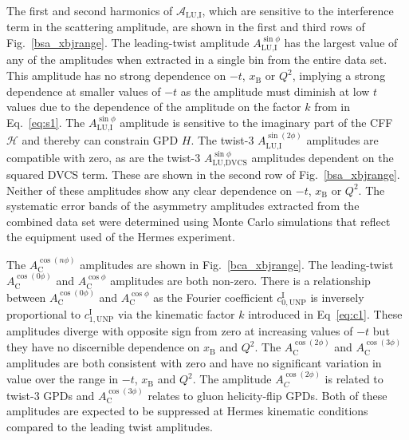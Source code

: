 The first and second harmonics of $\mathcal{A}_{\textrm{LU,I}}$, which are
sensitive to the interference term in the scattering amplitude, are shown in the first and third rows of Fig.~\ref{bsa_xbjrange}. The leading-twist amplitude $A_{\textrm{LU,I}}^{\sin\phi}$ has the largest value of any of the amplitudes when extracted in a single bin from the entire data set. This amplitude has no strong dependence on $-t$, $x_{\textrm{B}}$ or $Q^{2}$, implying a strong dependence at smaller values of $-t$ as the amplitude must diminish at low $t$ values due to the dependence of the amplitude on the factor $k$ from in Eq.~\ref{eq:s1}. The $A_{\textrm{LU,I}}^{\sin\phi}$ amplitude is sensitive to the imaginary part of the CFF $\mathcal{H}$ and thereby can constrain GPD $\textit{H}$. The twist-3 $A_{\textrm{LU,I}}^{\sin(2\phi)}$ amplitudes are compatible with zero, as are the twist-3 $A_{\textrm{LU,DVCS}}^{\sin\phi}$ amplitudes dependent on the squared DVCS term. These are shown in the second row of Fig.~\ref{bsa_xbjrange}. Neither of these amplitudes show any clear dependence on $-t$, $x_{\textrm{B}}$ or $Q^{2}$. The systematic error bands of the asymmetry amplitudes extracted from the combined data set were determined using Monte Carlo simulations that reflect the equipment used  of the H{\sc ermes} experiment. 

The $A_{\textrm{C}}^{\cos(n\phi)}$ amplitudes are shown in Fig.~\ref{bca_xbjrange}. The leading-twist $A_{\textrm{C}}^{\cos(0\phi)}$ and $A_{\textrm{C}}^{\cos\phi}$ amplitudes are both non-zero. There is a relationship between $A_{\textrm{C}}^{\cos(0\phi)}$ and $A_{\textrm{C}}^{\cos\phi}$ as the Fourier coefficient $c^{\textrm{I}}_{0,\textrm{UNP}}$ is inversely proportional to $c^{\textrm{I}}_{1,\textrm{UNP}}$ via the kinematic factor $k$ introduced in Eq~\ref{eq:c1}. These amplitudes diverge with opposite sign from zero at increasing values of $-t$ but they
have no discernible dependence on $x_{\textrm{B}}$ and $Q^{2}$. The $A_{\textrm{C}}^{\cos(2\phi)}$ and $A_{\textrm{C}}^{\cos(3\phi)}$ amplitudes are both consistent with zero and have no significant variation in value over the range in $-t$, $x_{\textrm{B}}$ and $Q^{2}$. The amplitude $A_{C}^{\cos(2\phi)}$ is related to twist-3 GPDs and $A_{\textrm{C}}^{\cos(3\phi)}$ relates to gluon helicity-flip GPDs. Both of these amplitudes are expected to be suppressed at H{\sc ermes} kinematic conditions compared to the leading twist amplitudes.

